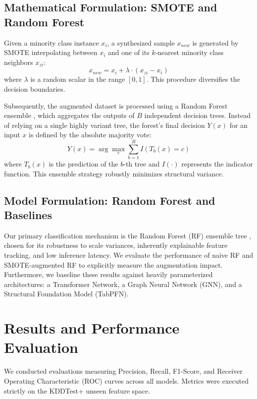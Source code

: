 \documentclass[sn-basic,oneside]{sn-jnl}
\theoremstyle{thmstyleone}%
\theoremstyle{thmstyletwo}%
\theoremstyle{thmstylethree}%
\begin{document}
\subsection{Mathematical Formulation: SMOTE and Random Forest}
Given a minority class instance $x_i$, a synthesized sample $x_{new}$ is generated by SMOTE interpolating between $x_i$ and one of its $k$-nearest minority class neighbors $x_{zi}$:
\begin{equation}
x_{new} = x_i + \lambda \cdot (x_{zi} - x_i)
\end{equation}
where $\lambda$ is a random scalar in the range $[0,1]$. This procedure diversifies the decision boundaries.

Subsequently, the augmented dataset is processed using a Random Forest ensemble \citep{breiman2001random}, which aggregates the outputs of $B$ independent decision trees. Instead of relying on a single highly variant tree, the forest's final decision $Y(x)$ for an input $x$ is defined by the absolute majority vote:
\begin{equation}
Y(x) = \arg\max_{c} \sum_{b=1}^{B} I(T_b(x) = c)
\end{equation}
where $T_b(x)$ is the prediction of the $b$-th tree and $I(\cdot)$ represents the indicator function. This ensemble strategy robustly minimizes structural variance.

\subsection{Model Formulation: Random Forest and Baselines}
Our primary classification mechanism is the Random Forest (RF) ensemble tree \citep{breiman2001random}, chosen for its robustness to scale variances, inherently explainable feature tracking, and low inference latency. We evaluate the performance of naive RF and SMOTE-augmented RF to explicitly measure the augmentation impact. Furthermore, we baseline these results against heavily parameterized architectures: a Transformer Network, a Graph Neural Network (GNN), and a Structural Foundation Model (TabPFN).

\section{Results and Performance Evaluation}\label{sec4}

We conducted evaluations measuring Precision, Recall, F1-Score, and Receiver Operating Characteristic (ROC) curves across all models. Metrics were executed strictly on the KDDTest+ unseen feature space.
\end{document}
